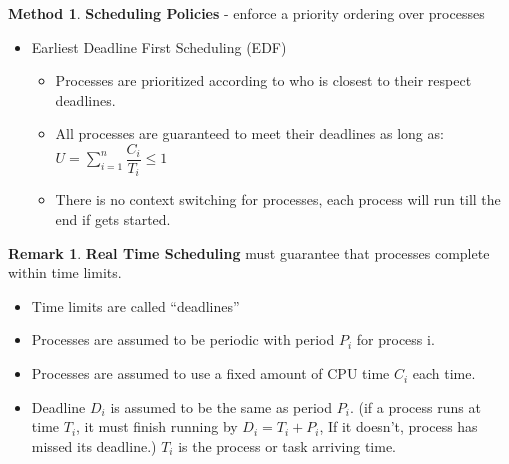 \documentclass[12pt,a4paper]{article}
\theoremstyle{definition}
\newtheorem*{remark}{Remark}
\newtheorem{method}{Method}[section]
\newenvironment{myitemize}
{ \begin{itemize}
    \setlength{\itemsep}{5pt}
    \setlength{\parskip}{0pt}
    \setlength{\parsep}{0pt}     }
{ \end{itemize}                  }
\begin{document}
\begin{method}{\textbf{Scheduling Policies} - enforce a priority ordering over processes}
\begin{myitemize}
\begin{myitemize}
\begin{myitemize}
				\item \textbf{Critical Instance Analysis} is used to test that all processes meet their deadlines
				\item We can also write down the table to see and the pattern will repeat for every $LCM ( P_1, \dots, P_n )$.
			\end{myitemize}
			\item Earliest Deadline First Scheduling (\textsf{EDF})
			\begin{myitemize}
				\item Processes are prioritized according to who is closest to their respect deadlines.
				\item All processes are guaranteed to meet their deadlines as long as: $U=\sum^n_{i=1}\dfrac{C_i}{T_i} \leq 1$
				\item There is no context switching for processes, each process will run till the end if gets started.
			\end{myitemize}
		\end{myitemize}
	\end{myitemize}
\end{method}

\begin{remark}{\textbf{Real Time Scheduling}}
	must guarantee that processes complete within time limits.
	
	\begin{myitemize}
		\item Time limits are called “deadlines”
		\item Processes are assumed to be periodic with period $P_i$ for process i.
		\item Processes are assumed to use a fixed amount of CPU time $C_i$ each time.
		\item Deadline $D_i$ is assumed to be the same as period $P_i$. (if a process runs at time $T_i$, it must finish running by $D_i=T_i+P_i$, If it doesn’t, process has missed its deadline.) $T_i$ is the process or task arriving time.
	\end{myitemize}
\end{remark}
\end{document}
